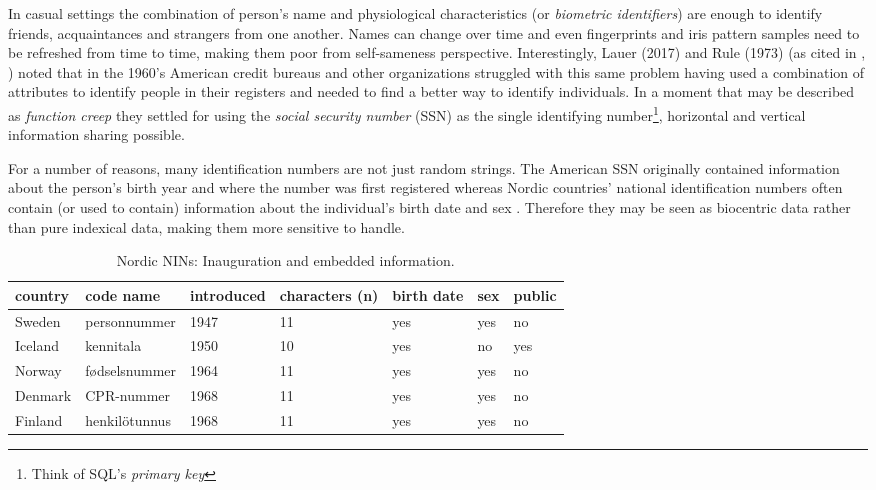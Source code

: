 In casual settings the combination of person's name and physiological characteristics (or \emph{biometric identifiers}) are enough to identify friends, acquaintances and strangers from one another. Names can change over time and even fingerprints and iris pattern samples need to be refreshed from time to time, making them poor from self-sameness perspective. Interestingly, Lauer (2017) and Rule (1973) (as cited in \citeauthor{brensinger2021}, \citeyear[31--32]{brensinger2021}) noted that in the 1960's American credit bureaus and other organizations struggled with this same problem having used a combination of attributes to identify people in their registers and needed to find a better way to identify individuals. In a moment that may be described as \emph{function creep} they settled for using the \emph{social security number} (SSN) as the single identifying number\footnote{Think of SQL's \emph{primary key}}, horizontal and vertical information sharing possible.

For a number of reasons, many identification numbers are not just random strings. The American SSN originally contained information about the person's birth year and where the number was first registered \citep[32]{brensinger2021} whereas Nordic countries' national identification numbers often contain (or used to contain) information about the individual's birth date and sex \citep{watson2010, salste2021}. Therefore they may be seen as biocentric data rather than pure indexical data, making them more sensitive to handle.

\begin{table}[ht]
\centering
\begin{tabular}{lllllll}
\toprule
  country & code name & introduced & characters (n) & birth date & sex & public \\
  \hline
  Sweden & personnummer & 1947 & 11 & yes & yes & no \\
  Iceland & kennitala & 1950 & 10 & yes & no & yes \\
  Norway & fødselsnummer & 1964 & 11 & yes & yes & no \\
  Denmark & CPR-nummer & 1968 & 11 & yes & yes & no \\
  Finland & henkilötunnus & 1968 & 11 & yes & yes & no \\
\bottomrule
\end{tabular}
\caption{Nordic NINs: Inauguration and embedded information.}
\label{tab:nordiccomparison}
\end{table}


